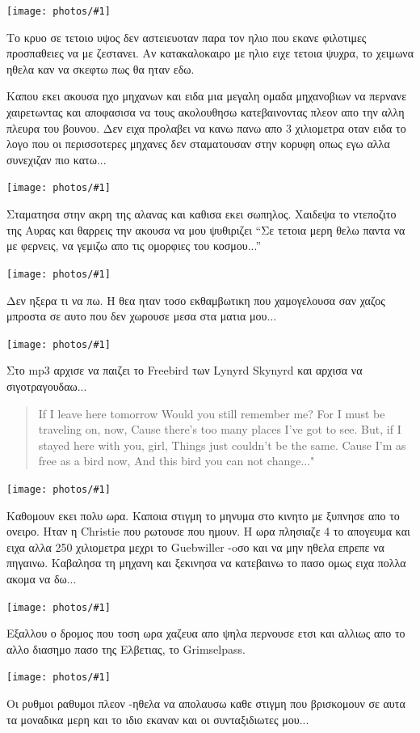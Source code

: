 \documentclass[11pt, letterpaper]{book}
\newcommand\photo[1]{\noindent\texttt{[image: photos/\#1]}}
\begin{document}
\photo{56.jpg}

Το κρυο σε τετοιο υψος δεν αστειευοταν παρα τον ηλιο που εκανε φιλοτιμες προσπαθειες να με ζεστανει. Αν κατακαλοκαιρο με ηλιο ειχε τετοια ψυχρα, το χειμωνα ηθελα καν να σκεφτω πως θα ηταν εδω.

Καπου εκει ακουσα ηχο μηχανων και ειδα μια μεγαλη ομαδα μηχανοβιων να περνανε χαιρετωντας και αποφασισα να τους ακολουθησω κατεβαινοντας πλεον απο την αλλη πλευρα του βουνου. Δεν ειχα προλαβει να κανω πανω απο 3 χιλιομετρα οταν ειδα το λογο που οι περισσοτερες μηχανες δεν σταματουσαν στην κορυφη οπως εγω αλλα συνεχιζαν πιο κατω...

\photo{57.jpg}

Σταματησα στην ακρη της αλανας και καθισα εκει σωπηλος. Χαιδεψα το ντεποζιτο της Αυρας και θαρρεις την ακουσα να μου ψυθιριζει ``Σε τετοια μερη θελω παντα να με φερνεις, να γεμιζω απο τις ομορφιες του κοσμου...''

\photo{58.jpg}

Δεν ηξερα τι να πω. Η θεα ηταν τοσο εκθαμβωτικη που χαμογελουσα σαν χαζος μπροστα σε αυτο που δεν χωρουσε μεσα στα ματια μου...

\photo{59.jpg}

Στο mp3 αρχισε να παιζει το Freebird των Lynyrd Skynyrd και αρχισα να σιγοτραγουδαω...

\begin{verse}
If I leave here tomorrow
Would you still remember me?
For I must be traveling on, now,
Cause there's too many places I've got to see.
But, if I stayed here with you, girl,
Things just couldn't be the same.
Cause I'm as free as a bird now,
And this bird you can not change..."
\end{verse}

\photo{60.jpg}

Καθομουν εκει πολυ ωρα. Καποια στιγμη το μηνυμα στο κινητο με ξυπνησε απο το ονειρο. Ηταν η Christie που ρωτουσε που ημουν. Η ωρα πλησιαζε 4 το απογευμα και ειχα αλλα 250 χιλιομετρα μεχρι το Guebwiller -oσο και να μην ηθελα επρεπε να πηγαινω.
Καβαλησα τη μηχανη και ξεκινησα να κατεβαινω το πασο ομως ειχα πολλα ακομα να δω...

\photo{61.jpg}

Εξαλλου ο δρομος που τοση ωρα χαζευα απο ψηλα περνουσε ετσι και αλλιως απο το αλλο διασημο πασο της Ελβετιας, το Grimselpass.

\photo{62.jpg}

Οι ρυθμοι ραθυμοι πλεον -ηθελα να απολαυσω καθε στιγμη που βρισκομουν σε αυτα τα μοναδικα μερη και το ιδιο εκαναν και οι συνταξιδιωτες μου...
\end{document}
